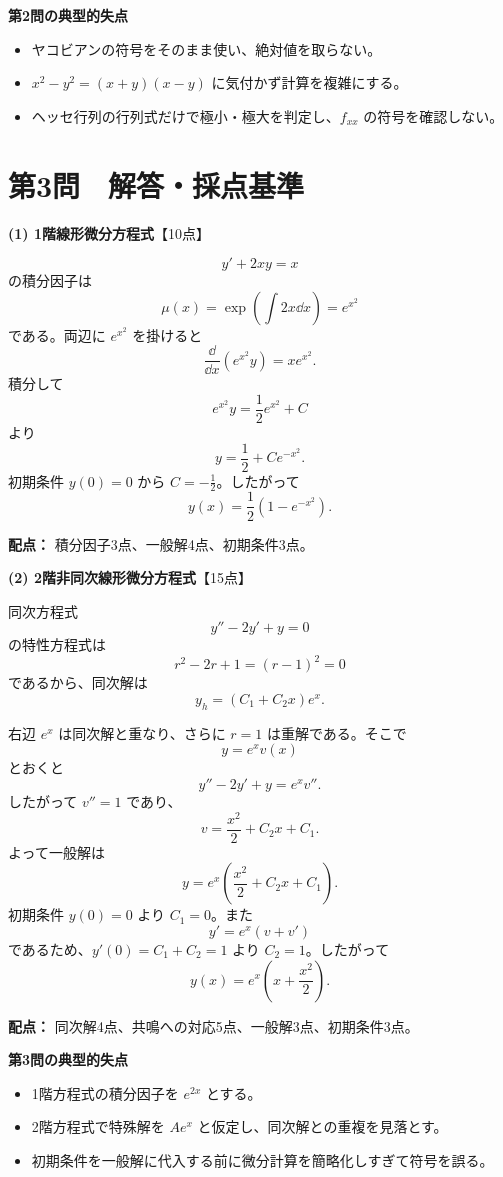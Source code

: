 \begin{pointbox}
\textbf{第2問の典型的失点}
\begin{itemize}[leftmargin=2em,itemsep=0.2em]
\item ヤコビアンの符号をそのまま使い、絶対値を取らない。
\item $x^2-y^2=(x+y)(x-y)$ に気付かず計算を複雑にする。
\item ヘッセ行列の行列式だけで極小・極大を判定し、$f_{xx}$ の符号を確認しない。
\end{itemize}
\end{pointbox}
\newpage

\section*{第3問　解答・採点基準 }
\begin{solutionbox}
\textbf{(1) 1階線形微分方程式}\hfill【10点】

\[
y'+2xy=x
\]
の積分因子は
\[
\mu(x)=\exp\left(\int 2x\dd x\right)=e^{x^2}
\]
である。両辺に $e^{x^2}$ を掛けると
\[
\frac{\dd}{\dd x}\left(e^{x^2}y\right)=xe^{x^2}.
\]
積分して
\[
e^{x^2}y=\frac12e^{x^2}+C
\]
より
\[
y=\frac12+Ce^{-x^2}.
\]
初期条件 $y(0)=0$ から $C=-\frac12$。したがって
\[
\boxed{y(x)=\frac12\left(1-e^{-x^2}\right)}.
\]

\textbf{配点：} 積分因子3点、一般解4点、初期条件3点。
\end{solutionbox}

\begin{solutionbox}
\textbf{(2) 2階非同次線形微分方程式}\hfill【15点】

同次方程式
\[
y''-2y'+y=0
\]
の特性方程式は
\[
r^2-2r+1=(r-1)^2=0
\]
であるから、同次解は
\[
y_h=(C_1+C_2x)e^x.
\]

右辺 $e^x$ は同次解と重なり、さらに $r=1$ は重解である。そこで
\[
y=e^xv(x)
\]
とおくと
\[
y''-2y'+y=e^xv''.
\]
したがって $v''=1$ であり、
\[
v=\frac{x^2}{2}+C_2x+C_1.
\]
よって一般解は
\[
y=e^x\left(\frac{x^2}{2}+C_2x+C_1\right).
\]
初期条件 $y(0)=0$ より $C_1=0$。また
\[
y'=e^x(v+v')
\]
であるため、$y'(0)=C_1+C_2=1$ より $C_2=1$。したがって
\[
\boxed{y(x)=e^x\left(x+\frac{x^2}{2}\right)}.
\]

\textbf{配点：} 同次解4点、共鳴への対応5点、一般解3点、初期条件3点。
\end{solutionbox}

\begin{pointbox}
\textbf{第3問の典型的失点}
\begin{itemize}[leftmargin=2em,itemsep=0.2em]
\item 1階方程式の積分因子を $e^{2x}$ とする。
\item 2階方程式で特殊解を $Ae^x$ と仮定し、同次解との重複を見落とす。
\item 初期条件を一般解に代入する前に微分計算を簡略化しすぎて符号を誤る。
\end{itemize}
\end{pointbox}
\newpage

